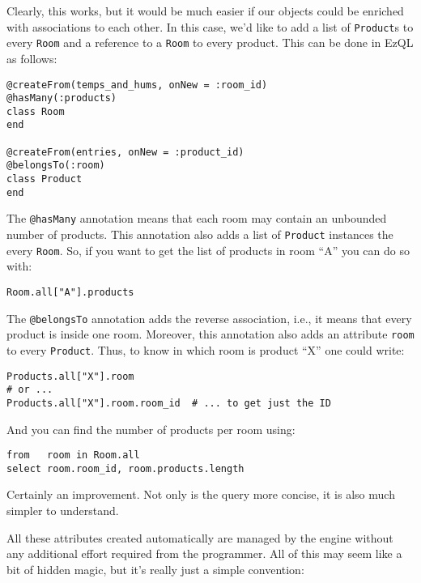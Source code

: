 \documentclass{report}
\begin{document}
Clearly, this works, but it would be much easier if our objects could
be enriched with associations to each other. In this case, we'd like
to add a list of \verb=Product=s to every \verb=Room= and a reference
to a \verb=Room= to every product. This can be done in EzQL as
follows:

\begin{verbatim}
@createFrom(temps_and_hums, onNew = :room_id)
@hasMany(:products)
class Room
end

@createFrom(entries, onNew = :product_id)
@belongsTo(:room)
class Product
end
\end{verbatim}

The \verb=@hasMany= annotation means that each room may contain an
unbounded number of products. This annotation also adds a list of
\verb=Product= instances the every \verb=Room=. So, if you want to get
the list of products in room ``A'' you can do so with:

\begin{verbatim}
Room.all["A"].products
\end{verbatim}

The \verb=@belongsTo= annotation adds the reverse association, i.e.,
it means that every product is inside one room. Moreover, this
annotation also adds an attribute \verb=room= to every
\verb=Product=. Thus, to know in which room is product ``X'' one could
write:

\begin{verbatim}
Products.all["X"].room
# or ...
Products.all["X"].room.room_id  # ... to get just the ID
\end{verbatim}

And you can find the number of products per room using:

\begin{verbatim}
from   room in Room.all
select room.room_id, room.products.length
\end{verbatim}

Certainly an improvement. Not only is the query more concise, it is
also much simpler to understand.

All these attributes created automatically are managed by the engine
without any additional effort required from the programmer. All of
this may seem like a bit of hidden magic, but it's really just a
simple convention:
\end{document}

